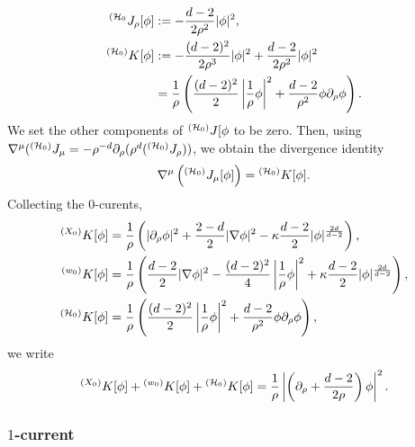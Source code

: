 	\begin{equation}
	\begin{split}
		{^{(\mathcal H_0}} J_\rho [\phi]
			&:= - \frac{d - 2}{2\rho^2} |\phi|^2, \\
		{^{(\mathcal H_0)}} K[\phi]
			&:= - \frac{(d - 2)^2}{2\rho^3} |\phi|^2 + \frac{d - 2}{2\rho^2} |\phi|^2\\
			&= \frac1\rho \left( \frac{(d -2)^2}{2} \left| \frac1\rho \phi \right|^2 + \frac{d - 2}{\rho^2} \phi \partial_\rho \phi \right)	.
	\end{split}		
	\end{equation}
We set the other components of $^{(\mathcal H_0)} J[\phi$ to be zero. Then, using $\nabla^\mu ({^{(\mathcal H_0)}} J_\mu  = - \rho^{-d} \partial_\rho (\rho^d ({^{(\mathcal H_0)}} J_\rho  ))$, we obtain the divergence identity 
	\begin{equation}
		\nabla^\mu \left( {^{(\mathcal H_0)}} J_\mu [\phi] \right) = {^{(\mathcal H_0)}} K[\phi].
	\end{equation}
Collecting the $0$-curents, 
	\begin{align}
		{^{(X_0)}} K[\phi]
			&= \frac1\rho \left( |\partial_\rho \phi|^2 + \frac{2 - d}{2} |\nabla \phi|^2 - \kappa \frac{d - 2}{2} |\phi|^{\frac{2d}{d - 2}} \right),\\
		{^{(w_0)}} K[\phi]
			&= \frac1\rho \left( \frac{d - 2}{2} |\nabla \phi|^2 - \frac{(d - 2)^2}{4} \left| \frac1\rho \phi\right|^2 + \kappa \frac{d - 2}{2} |\phi|^{\frac{2d}{d - 2}} \right),\\
		{^{(\mathcal H_0)}} K[\phi]
			&= \frac1\rho \left( \frac{(d - 2)^2}2 \left| \frac1\rho \phi\right|^2 + \frac{d - 2}{\rho^2} \phi \partial_\rho \phi \right),
	\end{align}
we write
	\begin{equation}
		 {^{(X_0)}} K[\phi] + {^{(w_0)}} K[\phi] + {^{(\mathcal H_0)}} K[\phi] = \frac1\rho \left| \left( \partial_\rho + \frac{d - 2}{2 \rho} \right) \phi \right|^2.
	\end{equation}
\subsubsection{$1$-current}


